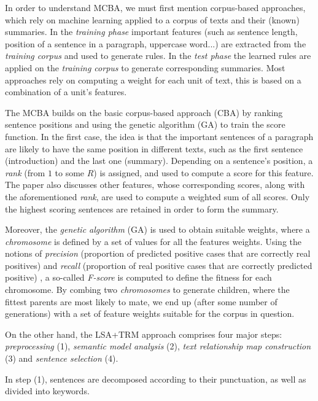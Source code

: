 \mbox{}

In order to understand MCBA, we must first mention corpus-based approaches, which rely on machine learning applied to a corpus of texts and their (known) summaries. In the \textit{training phase} important features (such as sentence length, position of a sentence in a paragraph, uppercase word...) are extracted from the \textit{training corpus} and used to generate rules. In the \textit{test phase} the learned rules are applied on the \textit{training corpus} to generate corresponding summaries. Most approaches rely on computing a weight for each unit of text, this is based on a combination of a unit's features.

The MCBA builds on the basic corpus-based approach (CBA) by ranking sentence positions and using the genetic algorithm (GA) to train the score function. In the first case, the idea is that the important sentences of a paragraph are likely to have the same position in different texts, such as the first sentence (introduction) and the last one (summary). Depending on a sentence's position, a \textit{rank} (from $1$ to some $R$) is assigned, and used to compute a score for this feature. The paper also discusses other features, whose corresponding scores, along with the aforementioned \textit{rank}, are used to compute a weighted sum of all scores. Only the highest scoring sentences are retained in order to form the summary.

Moreover, the \textit{genetic algorithm} (GA) is used to obtain suitable weights, where a \textit{chromosome} is defined by a set of values for all the features weights. Using the notions of \textit{precision} (proportion of predicted positive cases that are correctly real positives) and \textit{recall} (proportion of real positive cases that are correctly predicted positive) \cite{powers_evaluation_2011}, a so-called \textit{F-score} is computed to define the fitness for each chromosome. By combing two \textit{chromosomes} to generate children, where the fittest parents are most likely to mate, we end up (after some number of generations) with a set of feature weights suitable for the corpus in question.

\mbox{}

On the other hand, the LSA+TRM approach comprises four major steps: \textit{preprocessing} (1), \textit{semantic model analysis} (2), \textit{text relationship map construction} (3) and \textit{sentence selection} (4).

In step (1), sentences are decomposed according to their punctuation, as well as divided into keywords.

